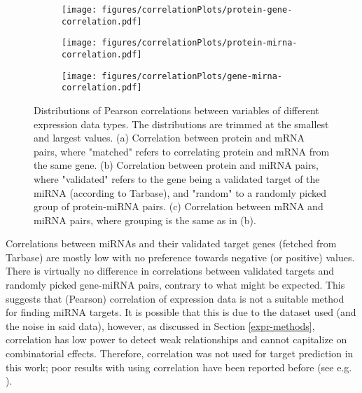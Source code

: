 \begin{figure}[!h]
  \centering
  \begin{subfigure}{.45\textwidth}
    \centering
    \texttt{[image: figures/correlationPlots/protein-gene-correlation.pdf]}
    \subcaption{ \label{fig:protein-gene-cor}}
  \end{subfigure}
  \begin{subfigure}{.45\textwidth}
    \centering
    \texttt{[image: figures/correlationPlots/protein-mirna-correlation.pdf]}
    \subcaption{ \label{fig:protein-mirna-cor}}
  \end{subfigure}
  \begin{subfigure}{.45\textwidth}
    \texttt{[image: figures/correlationPlots/gene-mirna-correlation.pdf]}
    \subcaption{ \label{fig:gene-mirna-cor}}
  \end{subfigure}

  \caption{Distributions of Pearson correlations between variables of different expression data types.
  The distributions are trimmed at the smallest and largest values.
  (a) Correlation between protein and mRNA pairs, where "matched" refers to correlating
  protein and mRNA from the same gene.
  (b) Correlation between protein and miRNA pairs, where "validated" refers to the gene
  being a validated target of the miRNA (according to Tarbase),
  and "random" to a randomly picked group of protein-miRNA pairs.
  (c) Correlation between mRNA and miRNA pairs,
  where grouping is the same as in (b).}
  \label{fig:correlations}
\end{figure}

Correlations between miRNAs and their validated target genes (fetched from
Tarbase) are mostly low with no preference towards negative (or positive)
values. There is virtually no difference in correlations between validated
targets and randomly picked gene-miRNA pairs, contrary to what might be
expected. This suggests that (Pearson) correlation of expression data is not a
suitable method for finding miRNA targets. It is possible that this is due to
the dataset used (and the noise in said data), however, as discussed in
Section \ref{expr-methods}, correlation has low power to detect weak
relationships and cannot capitalize on combinatorial effects. Therefore,
correlation was not used for target prediction in this work; poor
results with using correlation have been reported before
(see e.g. \citep{Muniategui2012}).




